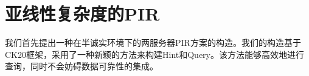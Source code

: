 \chapter{亚线性复杂度的PIR}

我们首先提出一种在半诚实环境下的两服务器PIR方案的构造。我们的构造基于CK20\cite{EC:CorKog20}框架，采用了一种新颖的方法来构建Hint和Query。该方法能够高效地进行查询，同时不会妨碍数据可靠性的集成。










